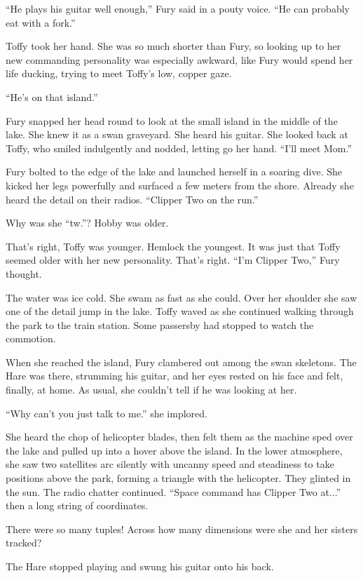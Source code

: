\documentclass[11pt,a5paper]{article}
\begin{document}
``He plays his guitar well enough,'' Fury said in a pouty voice. ``He can probably eat with a fork.''

Toffy took her hand. She was so much shorter than Fury, so looking up to her new commanding personality was especially awkward, like Fury would spend her life ducking, trying to meet Toffy's low, copper gaze.

``He's on that island.''

Fury snapped her head round to look at the small island in the middle of the lake. She knew it as a swan graveyard. She heard his guitar. She looked back at Toffy, who smiled indulgently and nodded, letting go her hand. ``I'll meet Mom.''

Fury bolted to the edge of the lake and launched herself in a soaring dive. She kicked her legs powerfully and surfaced a few meters from the shore. Already she heard the detail on their radios. ``Clipper Two on the run.''

Why was she ``tw.''? Hobby was older.

That's right, Toffy was younger. Hemlock the youngest. It was just that Toffy seemed older with her new personality. That's right. ``I'm Clipper Two,'' Fury thought.

The water was ice cold. She swam as fast as she could. Over her shoulder she saw one of the detail jump in the lake. Toffy waved as she continued walking through the park to the train station. Some passersby had stopped to watch the commotion.

When she reached the island, Fury clambered out among the swan skeletons. The Hare was there, strumming his guitar, and her eyes rested on his face and felt, finally, at home. As usual, she couldn't tell if he was looking at her.

``Why can't you just talk to me.'' she implored.

She heard the chop of helicopter blades, then felt them as the machine sped over the lake and pulled up into a hover above the island. In the lower atmosphere, she saw two satellites arc silently with uncanny speed and steadiness to take positions above the park, forming a triangle with the helicopter. They glinted in the sun. The radio chatter continued. ``Space command has Clipper Two at...'' then a long string of coordinates.

There were so many tuples! Across how many dimensions were she and her sisters tracked?

The Hare stopped playing and swung his guitar onto his back.
\end{document}
